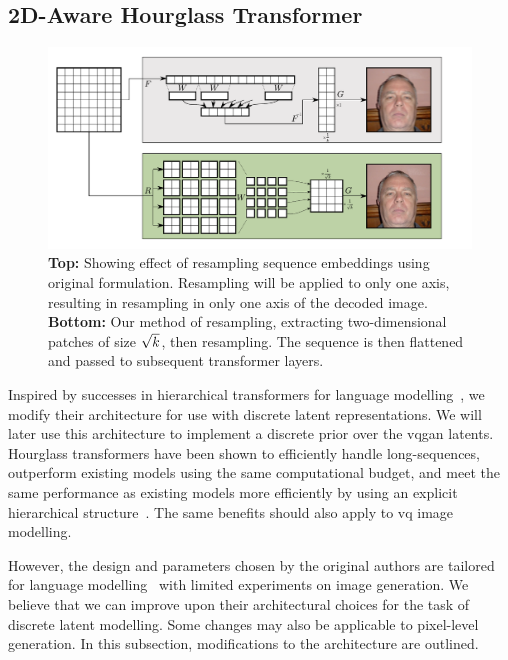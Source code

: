 \subsection{2D-Aware Hourglass Transformer}
\label{subsec:improvedHourglass}

\begin{figure}[htp]
    \label{fig:resample}
    \centering
    \includegraphics[width=\textwidth]{figures/resample.pdf}
    \caption{
        \textbf{Top:} Showing effect of resampling sequence embeddings using
        original formulation. Resampling will be applied to only one axis,
        resulting in resampling in only one axis of the decoded image.
        \textbf{Bottom:} Our method of resampling, extracting 
        two-dimensional patches of size $\sqrt{k}$, then 
        resampling. The sequence is then flattened and passed to
        subsequent transformer layers.
    }
\end{figure}

Inspired by successes in hierarchical transformers for language
modelling~\cite{nawrot2021hierarchical}, we modify their architecture for use
with discrete latent representations. We will later use this architecture to
implement a discrete prior over the \gls{vqgan} latents. Hourglass transformers
have been shown to efficiently handle long-sequences, outperform existing models
using the same computational budget, and meet the same performance as existing
models more efficiently by using an explicit hierarchical
structure~\cite{nawrot2021hierarchical}. The same benefits should also apply to
\gls{vq} image modelling. 

However, the design and parameters chosen by the original authors are tailored
for language modelling~\cite{nawrot2021hierarchical} with limited experiments on
image generation. We believe that we can improve upon their architectural
choices for the task of discrete latent modelling. Some changes may also be
applicable to pixel-level generation. In this subsection, modifications to the
architecture are outlined.

